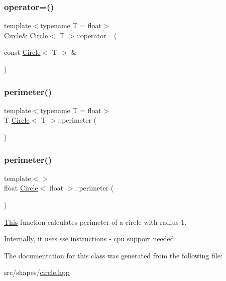 \subsubsection{\texorpdfstring{operator=()}{operator=()}\hspace{0.1cm}{\footnotesize\ttfamily [2/2]}}
{\footnotesize\ttfamily template$<$typename T  = float$>$ \\
\mbox{\hyperlink{classCircle}{Circle}}\& \mbox{\hyperlink{classCircle}{Circle}}$<$ T $>$\+::operator= (\begin{DoxyParamCaption}\item[{const \mbox{\hyperlink{classCircle}{Circle}}$<$ T $>$ \&}]{ }\end{DoxyParamCaption})\hspace{0.3cm}{\ttfamily [default]}}

\mbox{\label{classCircle_a6f066fc39c0de339b0498b04a56be028}} 
\subsubsection{\texorpdfstring{perimeter()}{perimeter()}\hspace{0.1cm}{\footnotesize\ttfamily [1/2]}}
{\footnotesize\ttfamily template$<$typename T  = float$>$ \\
T \mbox{\hyperlink{classCircle}{Circle}}$<$ T $>$\+::perimeter (\begin{DoxyParamCaption}{ }\end{DoxyParamCaption})}

\mbox{\label{classCircle_aa6c86a4a5d3ee7eb598879ba856430d9}} 
\subsubsection{\texorpdfstring{perimeter()}{perimeter()}\hspace{0.1cm}{\footnotesize\ttfamily [2/2]}}
{\footnotesize\ttfamily template$<$$>$ \\
float \mbox{\hyperlink{classCircle}{Circle}}$<$ float $>$\+::perimeter (\begin{DoxyParamCaption}{ }\end{DoxyParamCaption})\hspace{0.3cm}{\ttfamily [inline]}}



\mbox{\hyperlink{classThis}{This}} function calculates perimeter of a circle with radius 1. 

Internally, it uses sse instructions -\/ cpu support needed. 

The documentation for this class was generated from the following file\+:\begin{DoxyCompactItemize}
\item 
src/shapes/\mbox{\hyperlink{circle_8hpp}{circle.\+hpp}}\end{DoxyCompactItemize}
